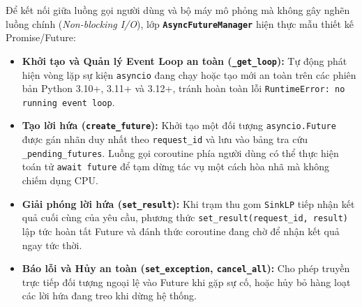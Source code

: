 \hspace{0.5cm}Để kết nối giữa luồng gọi người dùng và bộ máy mô phỏng mà không gây nghẽn luồng chính (\textit{Non-blocking I/O}), lớp \textbf{\texttt{AsyncFutureManager}} hiện thực mẫu thiết kế Promise/Future:
\begin{itemize}[leftmargin=1.5em, itemsep=2pt]
\item \textbf{Khởi tạo và Quản lý Event Loop an toàn (\texttt{\_get\_loop}):} Tự động phát hiện vòng lặp sự kiện \texttt{asyncio} đang chạy hoặc tạo mới an toàn trên các phiên bản Python 3.10+, 3.11+ và 3.12+, tránh hoàn toàn lỗi \texttt{RuntimeError: no running event loop}.
\item \textbf{Tạo lời hứa (\texttt{create\_future}):} Khởi tạo một đối tượng \texttt{asyncio.Future} được gán nhãn duy nhất theo \texttt{request\_id} và lưu vào bảng tra cứu \texttt{\_pending\_futures}. Luồng gọi coroutine phía người dùng có thể thực hiện toán tử \texttt{await future} để tạm dừng tác vụ một cách hòa nhã mà không chiếm dụng CPU.
\item \textbf{Giải phóng lời hứa (\texttt{set\_result}):} Khi trạm thu gom \texttt{SinkLP} tiếp nhận kết quả cuối cùng của yêu cầu, phương thức \texttt{set\_result(request\_id, result)} lập tức hoàn tất Future và đánh thức coroutine đang chờ để nhận kết quả ngay tức thời.
\item \textbf{Báo lỗi và Hủy an toàn (\texttt{set\_exception}, \texttt{cancel\_all}):} Cho phép truyền trực tiếp đối tượng ngoại lệ vào Future khi gặp sự cố, hoặc hủy bỏ hàng loạt các lời hứa đang treo khi dừng hệ thống.
\end{itemize}

